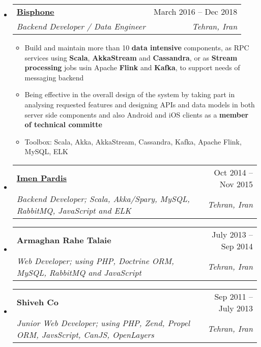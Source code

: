 \documentclass[letterpaper,12pt]{article}[leftmargin=*]
\makeatletter
\def \entryspacing {-0pt}
\newcommand{\resumeEntryStart}{\begin{itemize}[leftmargin=2.5mm]}
\newcommand{\resumeEntryEnd}{\end{itemize}\vspace{\entryspacing}}
\newcommand{\resumeItemListStart}{\begin{itemize}[leftmargin=4.5mm]}
\newcommand{\resumeItemListEnd}{\end{itemize}}
\newcommand{\resumeItem}[1]{
  \item\small{
    {#1 \vspace{-2pt}}
  }
}
\newcommand{\resumeEntryTSDL}[4]{
  \vspace{-1pt}\item[]
    \begin{tabular*}{0.97\textwidth}{l@{\extracolsep{\fill}}r}
      \textbf{\color{primary}#1} & {\firabook\color{accent}\small#2} \\
      \textit{\color{accent}\small#3} & \textit{\color{accent}\small#4} \\
    \end{tabular*}\vspace{-6pt}
}
\makeatother
\begin{document}

  \resumeEntryStart
    \resumeEntryTSDL
      {\href{http://bisphone.com}{Bisphone}}{March 2016 -- Dec 2018}
      {Backend Developer / Data Engineer}{Tehran, Iran}
    \resumeItemListStart
      \resumeItem{Build and maintain more than 10 \textbf{data intensive} components, as RPC services using \textbf{Scala}, \textbf{AkkaStream} and \textbf{Cassandra}, or as \textbf{Stream processing} jobs usin Apache \textbf{Flink} and \textbf{Kafka}, to support needs of messaging backend}
      \resumeItem{Being effective in the overall design of the system by taking part in analysing requested features and designing APIs and data models in both server side components and also Android and iOS clients as a \textbf{member of technical committe}}
      \resumeItem{Toolbox: Scala, Akka, AkkaStream, Cassandra, Kafka, Apache Flink, MySQL, ELK}
    \resumeItemListEnd
  \resumeEntryEnd


  \resumeEntryStart
    \resumeEntryTSDL
	  {\href{https://imenpardis.com/fa/}{Imen Pardis}}{Oct 2014 -- Nov 2015}
      {Backend Developer; Scala, Akka/Spary, MySQL, RabbitMQ, JavaScript and ELK}{Tehran, Iran}
  \resumeEntryEnd

\vspace{-13pt} %

  \resumeEntryStart
    \resumeEntryTSDL
      {Armaghan Rahe Talaie}{July 2013 -- Sep 2014}
      {Web Developer; using PHP, Doctrine ORM, MySQL, RabbitMQ and JavaScript}{Tehran, Iran}
  \resumeEntryEnd

\vspace{-13pt} %

  \resumeEntryStart
    \resumeEntryTSDL
      {Shiveh Co}{Sep 2011 -- July 2013}
      {Junior Web Developer; using PHP, Zend, Propel ORM, JavsScript, CanJS, OpenLayers}{Tehran, Iran}
  \resumeEntryEnd
\end{document}
